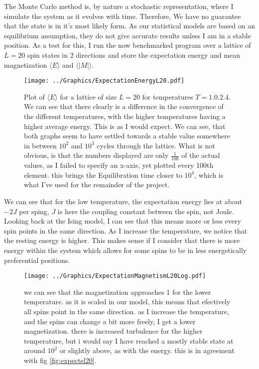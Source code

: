 \documentclass[10pt, twocolumn]{revtex4-1}
\begin{document}
The Monte Carlo method is, by nature a stochastic representation, where I simulate the system as it evolves with time. Therefore, We have no guarantee that
the state is in it's most likely form. As our statistical models are based on an equilibrium assumption, they do not give accurate results unless I am in
a stable position. As a test for this, I run the now benchmarked program over a lattice of $L=20$ spin states in 2 directions and store the expectation
energy and mean magnetization $\langle E \rangle$ and $\langle |M| \rangle$.\cite{Project4git}
\begin{figure}[hbtp]
\texttt{[image: ../Graphics/ExpectationEnergyL20.pdf]}
    \caption{Plot of $\langle E \rangle$ for a lattice of size $L=20$ for temperatures $T = \qty{ 1.0, 2.4 }$. We can see that there clearly is
        a difference in the convergence of the different temperatures, with the higher temperatures having a higher average energy. This
        is as I would expect. We can see, that both graphs seem to have settled towards a stable value somewhere in between $10^2$ and $10^3$
        cycles through the lattice. What is not obvious, is that the numbers displayed are only $\frac{1}{100}$ of the actual values, as I failed
        to specify an x-axis, yet plotted every 100th element. this brings the Equilibration time closer to $10^4$, which is what I've used for the
        remainder of the project.}
\label{fig:ExpectEL20}
\end{figure}
We can see that for the low temperature, the expectation energy lies at about $-2J$ per sping, $J$ is here the coupling constant between the spin, not
Joule. Looking back at the Ising model, I can see that this means more or less every spin points in the same direction. As I increase the temperature,
we notice that the resting energy is higher. This makes sense if I consider that there is more energy within the system which allows for some spins to be
in less energetically preferential positions.
\begin{figure}[hbtp]
    \texttt{[image: ../Graphics/ExpectationMagnetismL20Log.pdf]}
    \caption{we can see that the magnetization approaches 1 for the lower temperature. as it is scaled in our model, this means that efectively all spins
    point in the same direction. as I increase the temperature, and the spins can change a bit more freely, I get a lower magnetization. there is increased
    turbulence for the higher temperature, but i would say I have reached a mostly stable state at around $10^2$ or slightly above, as with the energy.
    this is in agreement with fig \ref{fig:expectel20}.}
\label{fig:expectml20}
\end{figure}
\end{document}
